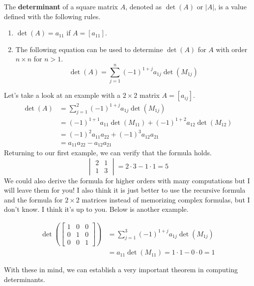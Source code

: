 \documentclass[../../../main.tex]{subfiles}
\begin{document}
\begin{definition}{}{}
The \textbf{determinant} of a square matrix $A$, denoted as $\det(A)$
or $|A|$, is a value defined with the following rules.
\begin{enumerate}[noitemsep]
\item $\det(A) = a_{11}$ if $A = [a_{11}]$.
\item The following equation can be used to determine $\det(A)$ for
$A$ with order $n \times n$ for $n > 1$.
\vspace{-0.5\baselineskip}
\[
\det(A)
= \sum_{j=1}^n (-1)^{1 + j} a_{1j} \det(M_{1j})
\]
\end{enumerate}
\end{definition}

Let's take a look at an example with a $2 \times 2$ matrix
$A = [a_{ij}]$.
\begin{align*}
    \det(A)
    &= \sum_{j=1}^2 (-1)^{1 + j} a_{1j} \det(M_{1j}) \\
    &= (-1)^{1 + 1} a_{11} \det(M_{11}) +
        (-1)^{1 + 2} a_{12} \det(M_{12}) \\
    &= (-1)^{2} a_{11} a_{22} + (-1)^{3} a_{12} a_{21} \\
    &= a_{11} a_{22} - a_{12} a_{21}
\end{align*}
Returning to our first example, we can verify that the formula holds.
\[
\begin{vmatrix}
    2 & 1 \\
    1 & 3
\end{vmatrix}
= 2 \cdot 3 - 1 \cdot 1
= 5
\]
We could also derive the formula for higher orders with many
computations but I will leave them for you! I also think it is
just better to use the recursive formula and the formula for
$2 \times 2$ matrices instead of memorizing complex formulas,
but I don't know. I think it's up to you. Below is another
example.

\begin{align*}
    \det\left(
        \begin{bmatrix}
            1 & 0 & 0 \\
            0 & 1 & 0 \\
            0 & 0 & 1
        \end{bmatrix}
    \right)
    &= \sum_{j=1}^3 (-1)^{1 + j} a_{1j} \det(M_{1j}) \\
    &= a_{11} \det(M_{11})
    = 1 \cdot 1 - 0 \cdot 0 = 1
\end{align*}

With these in mind, we can establish a very important theorem in
computing determinants.
\end{document}
